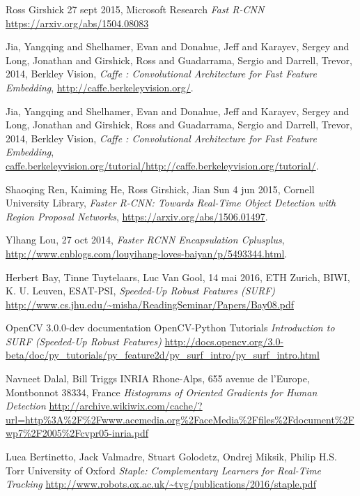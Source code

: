 \begin{thebibliography}{9}
  Ross Girshick
  27 sept 2015, 
  Microsoft Research
  \emph{Fast R-CNN}
  \url{https://arxiv.org/abs/1504.08083}
  
  Jia, Yangqing and Shelhamer, Evan and Donahue, Jeff and Karayev, Sergey and Long, Jonathan and Girshick, Ross and Guadarrama, Sergio and Darrell, Trevor,
  2014,
  Berkley Vision,
  \emph{Caffe : Convolutional Architecture for Fast Feature Embedding},
  \url{http://caffe.berkeleyvision.org/}.

  Jia, Yangqing and Shelhamer, Evan and Donahue, Jeff and Karayev, Sergey and Long, Jonathan and Girshick, Ross and Guadarrama, Sergio and Darrell, Trevor,
  2014,
  Berkley Vision,
  \emph{Caffe : Convolutional Architecture for Fast Feature Embedding},
  \url{caffe.berkeleyvision.org/tutorial/http://caffe.berkeleyvision.org/tutorial/}.

  Shaoqing Ren, Kaiming He, Ross Girshick, Jian Sun
  4 jun 2015,
  Cornell University Library,
  \emph{Faster R-CNN: Towards Real-Time Object Detection with Region Proposal Networks},
  \url{https://arxiv.org/abs/1506.01497}.
  

  Ylhang Lou,
  27 oct 2014,
  \emph{Faster RCNN Encapsulation Cplusplus},
  \url{http://www.cnblogs.com/louyihang-loves-baiyan/p/5493344.html}.  
  
  Herbert Bay, Tinne Tuytelaars, Luc Van Gool, 
  14 mai 2016,
  ETH Zurich, BIWI,
  K. U. Leuven, ESAT-PSI,
  \emph{Speeded-Up Robust Features (SURF)}
  \url{http://www.cs.jhu.edu/~misha/ReadingSeminar/Papers/Bay08.pdf}
  
  OpenCV 3.0.0-dev documentation
  OpenCV-Python Tutorials
  \emph{Introduction to SURF (Speeded-Up Robust Features)}
  \url{http://docs.opencv.org/3.0-beta/doc/py_tutorials/py_feature2d/py_surf_intro/py_surf_intro.html}
  
	Navneet Dalal, Bill Triggs
	INRIA Rhone-Alps, 655 avenue de l’Europe, Montbonnot 38334, France
	\emph{Histograms of Oriented Gradients for Human Detection}
	\url{http://archive.wikiwix.com/cache/?url=http%3A%2F%2Fwww.acemedia.org%2FaceMedia%2Ffiles%2Fdocument%2Fwp7%2F2005%2Fcvpr05-inria.pdf}
	
	Luca Bertinetto, Jack Valmadre, Stuart Golodetz, Ondrej Miksik, Philip H.S. Torr
	University of Oxford
	\emph{Staple: Complementary Learners for Real-Time Tracking}
	\url{http://www.robots.ox.ac.uk/~tvg/publications/2016/staple.pdf}


\end{thebibliography}
